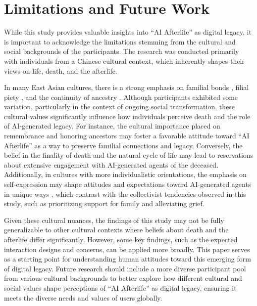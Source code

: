 \section{Limitations and Future Work}
While this study provides valuable insights into ``AI Afterlife'' as digital legacy, it is important to acknowledge the limitations stemming from the cultural and social backgrounds of the participants. The research was conducted primarily with individuals from a Chinese cultural context, which inherently shapes their views on life, death, and the afterlife.

In many East Asian cultures, there is a strong emphasis on familial bonds \cite{freedman1961family, qi2016family}, filial piety \cite{hwang1999filial, whyte1997fate}, and the continuity of ancestry \cite{song2015ancestry}. Although participants exhibited some variation, particularly in the context of ongoing social transformation, these cultural values significantly influence how individuals perceive death and the role of AI-generated legacy. For instance, the cultural importance placed on remembrance and honoring ancestors may foster a favorable attitude toward ``AI Afterlife'' as a way to preserve familial connections and legacy. Conversely, the belief in the finality of death and the natural cycle of life may lead to reservations about extensive engagement with AI-generated agents of the deceased. Additionally, in cultures with more individualistic orientations, the emphasis on self-expression may shape attitudes and expectations toward AI-generated agents in unique ways \cite{hunter2008beyond, kim2007express, kim2003choice, inglehart2004individualism}, which contrast with the collectivist tendencies observed in this study, such as prioritizing support for family and alleviating grief.

Given these cultural nuances, the findings of this study may not be fully generalizable to other cultural contexts where beliefs about death and the afterlife differ significantly. However, some key findings, such as the expected interaction designs and concerns, can be applied more broadly. This paper serves as a starting point for understanding human attitudes toward this emerging form of digital legacy. Future research should include a more diverse participant pool from various cultural backgrounds to better explore how different cultural and social values shape perceptions of ``AI Afterlife'' as digital legacy, ensuring it meets the diverse needs and values of users globally.